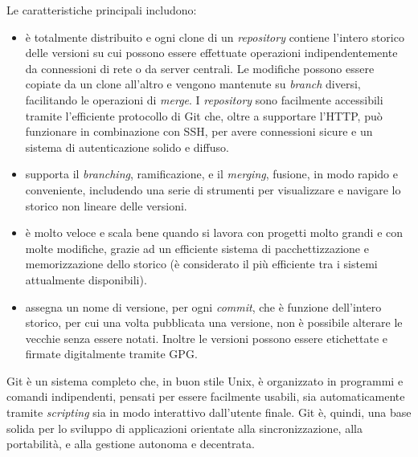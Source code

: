 Le caratteristiche principali includono:
\begin{itemize}
\item è totalmente distribuito e ogni clone di un
  \emph{repository} contiene l'intero storico delle versioni su cui
  possono essere effettuate operazioni indipendentemente da
  connessioni di rete o da server centrali. Le modifiche possono
  essere copiate da un clone all'altro e vengono mantenute su
  \emph{branch} diversi, facilitando le operazioni di \emph{merge}. I
  \emph{repository} sono facilmente accessibili tramite l'efficiente
  protocollo di Git che, oltre a supportare l'HTTP, può funzionare in
  combinazione con SSH, per avere connessioni sicure e un sistema di
  autenticazione solido e diffuso.
\item supporta il \emph{branching}, ramificazione, e il
  \emph{merging}, fusione, in modo rapido e conveniente, includendo
  una serie di strumenti per visualizzare e navigare lo storico non
  lineare delle versioni.
\item è molto veloce e scala bene quando si lavora con progetti
  molto grandi e con molte modifiche, grazie ad un efficiente sistema
  di pacchettizzazione e memorizzazione dello storico (è considerato
  il più efficiente tra i sistemi attualmente disponibili).
\item assegna un nome di versione, per ogni \emph{commit},
  che è funzione dell'intero storico, per cui una volta pubblicata una
  versione, non è possibile alterare le vecchie senza essere
  notati. Inoltre le versioni possono essere etichettate e firmate
  digitalmente tramite GPG.
\end{itemize}

Git è un sistema completo che, in buon stile Unix, è organizzato in
programmi e comandi indipendenti, pensati per essere facilmente
usabili, sia automaticamente tramite \emph{scripting} sia in modo
interattivo dall'utente finale. Git è, quindi, una base solida per lo
sviluppo di applicazioni orientate alla sincronizzazione, alla
portabilità, e alla gestione autonoma e decentrata.

